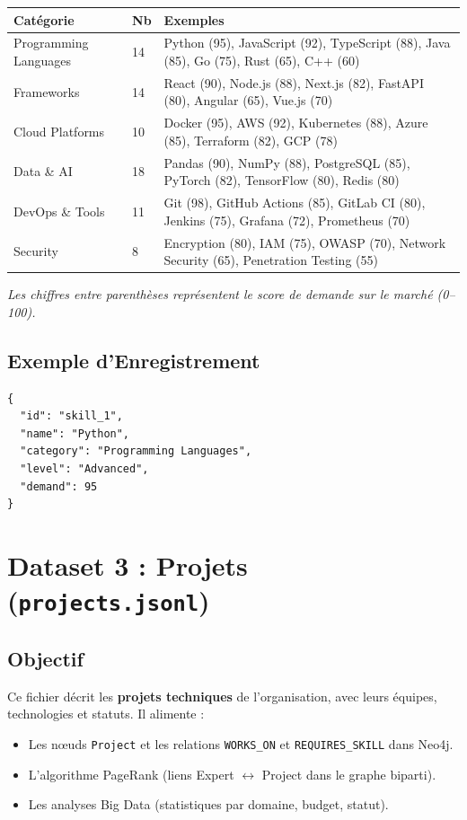 \documentclass[12pt,a4paper]{article}
\begin{document}
\begin{longtable}{|p{4cm}|p{1.5cm}|p{8cm}|}
\hline
\rowcolor{bleu!15}
\textbf{Catégorie} & \textbf{Nb} & \textbf{Exemples} \\
\hline
Programming Languages & 14 & Python (95), JavaScript (92), TypeScript (88), Java (85), Go (75), Rust (65), C++ (60) \\
\hline
Frameworks & 14 & React (90), Node.js (88), Next.js (82), FastAPI (80), Angular (65), Vue.js (70) \\
\hline
Cloud Platforms & 10 & Docker (95), AWS (92), Kubernetes (88), Azure (85), Terraform (82), GCP (78) \\
\hline
Data \& AI & 18 & Pandas (90), NumPy (88), PostgreSQL (85), PyTorch (82), TensorFlow (80), Redis (80) \\
\hline
DevOps \& Tools & 11 & Git (98), GitHub Actions (85), GitLab CI (80), Jenkins (75), Grafana (72), Prometheus (70) \\
\hline
Security & 8 & Encryption (80), IAM (75), OWASP (70), Network Security (65), Penetration Testing (55) \\
\hline
\end{longtable}

\textit{Les chiffres entre parenthèses représentent le score de demande sur le marché (0--100).}

\subsection{Exemple d'Enregistrement}

\begin{lstlisting}[language={}]
{
  "id": "skill_1",
  "name": "Python",
  "category": "Programming Languages",
  "level": "Advanced",
  "demand": 95
}
\end{lstlisting}

\section{Dataset 3 : Projets (\texttt{projects.jsonl})}

\subsection{Objectif}

Ce fichier décrit les \textbf{projets techniques} de l'organisation, avec leurs équipes, technologies et statuts. Il alimente :
\begin{itemize}[leftmargin=*]
    \item Les nœuds \texttt{Project} et les relations \texttt{WORKS\_ON} et \texttt{REQUIRES\_SKILL} dans Neo4j.
    \item L'algorithme PageRank (liens Expert $\leftrightarrow$ Project dans le graphe biparti).
    \item Les analyses Big Data (statistiques par domaine, budget, statut).
\end{itemize}
\end{document}
